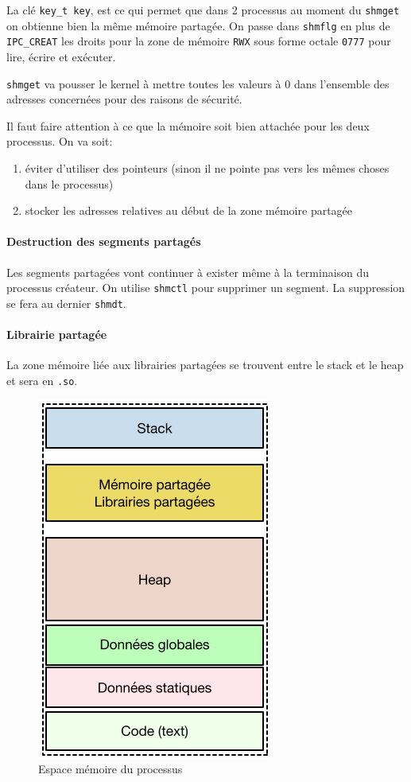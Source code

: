 La clé \texttt{key\_t\ key}, est ce qui permet que dans 2 processus au
moment du \texttt{shmget} on obtienne bien la même mémoire partagée. On
passe dans \texttt{shmflg} en plus de \texttt{IPC\_CREAT} les droits
pour la zone de mémoire \texttt{RWX} sous forme octale \texttt{0777}
pour lire, écrire et exécuter.

\texttt{shmget} va pousser le kernel à mettre toutes les valeurs à 0
dans l'ensemble des adresses concernées pour des raisons de sécurité.

Il faut faire attention à ce que la mémoire soit bien attachée pour les
deux processus. On va soit:

\begin{enumerate}
\def\labelenumi{\arabic{enumi}.}
\tightlist
\item
  éviter d'utiliser des pointeurs (sinon il ne pointe pas vers les mêmes
  choses dans le processus)
\item
  stocker les adresses relatives au début de la zone mémoire partagée
\end{enumerate}

\paragraph{Destruction des segments
partagés}\label{destruction-des-segments-partaguxe9s}

Les segments partagées vont continuer à exister même à la terminaison du
processus créateur. On utilise \texttt{shmctl} pour supprimer un
segment. La suppression se fera au dernier \texttt{shmdt}.

\paragraph{Librairie partagée}\label{librairie-partaguxe9e}

La zone mémoire liée aux librairies partagées se trouvent entre le stack
et le heap et sera en \texttt{.so}.

\begin{figure}
\centering
\includegraphics{image-62.png}
\caption{Espace mémoire du processus}
\end{figure}

